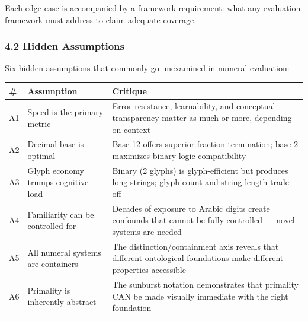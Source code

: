 \documentclass[
]{article}
\newcounter{none} %
\begin{document}
Each edge case is accompanied by a framework requirement: what any
evaluation framework must address to claim adequate coverage.

\subsubsection{4.2 Hidden Assumptions}\label{hidden-assumptions}

Six hidden assumptions that commonly go unexamined in numeral
evaluation:

{\def\LTcaptype{none} %
\begin{longtable}[]{@{}
  >{\raggedright\arraybackslash}p{}
  >{\raggedright\arraybackslash}p{}
  >{\raggedright\arraybackslash}p{}@{}}
\toprule\noalign{}
\begin{minipage}[b]{\linewidth}\raggedright
\#
\end{minipage} & \begin{minipage}[b]{\linewidth}\raggedright
Assumption
\end{minipage} & \begin{minipage}[b]{\linewidth}\raggedright
Critique
\end{minipage} \\
\midrule\noalign{}
\endhead
\bottomrule\noalign{}
\endlastfoot
A1 & Speed is the primary metric & Error resistance, learnability, and
conceptual transparency matter as much or more, depending on context \\
A2 & Decimal base is optimal & Base-12 offers superior fraction
termination; base-2 maximizes binary logic compatibility \\
A3 & Glyph economy trumps cognitive load & Binary (2 glyphs) is
glyph-efficient but produces long strings; glyph count and string length
trade off \\
A4 & Familiarity can be controlled for & Decades of exposure to Arabic
digits create confounds that cannot be fully controlled --- novel
systems are needed \\
A5 & All numeral systems are containers & The distinction/containment
axis reveals that different ontological foundations make different
properties accessible \\
A6 & Primality is inherently abstract & The sunburst notation
demonstrates that primality CAN be made visually immediate with the
right foundation \\
\end{longtable}
}
\end{document}
